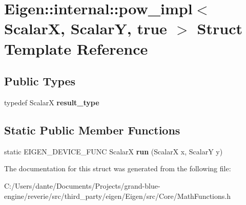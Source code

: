 \hypertarget{struct_eigen_1_1internal_1_1pow__impl_3_01_scalar_x_00_01_scalar_y_00_01true_01_4}{}\section{Eigen\+::internal\+::pow\+\_\+impl$<$ ScalarX, ScalarY, true $>$ Struct Template Reference}
\label{struct_eigen_1_1internal_1_1pow__impl_3_01_scalar_x_00_01_scalar_y_00_01true_01_4}
\subsection*{Public Types}
\begin{DoxyCompactItemize}
\item 
\mbox{\label{struct_eigen_1_1internal_1_1pow__impl_3_01_scalar_x_00_01_scalar_y_00_01true_01_4_a03ee925b6c3569dc25b880c04d22063a}} 
typedef ScalarX {\bfseries result\+\_\+type}
\end{DoxyCompactItemize}
\subsection*{Static Public Member Functions}
\begin{DoxyCompactItemize}
\item 
\mbox{\label{struct_eigen_1_1internal_1_1pow__impl_3_01_scalar_x_00_01_scalar_y_00_01true_01_4_a77a3eb6ae98679ed7ad23b6a965b4221}} 
static E\+I\+G\+E\+N\+\_\+\+D\+E\+V\+I\+C\+E\+\_\+\+F\+U\+NC ScalarX {\bfseries run} (ScalarX x, ScalarY y)
\end{DoxyCompactItemize}


The documentation for this struct was generated from the following file\+:\begin{DoxyCompactItemize}
\item 
C\+:/\+Users/dante/\+Documents/\+Projects/grand-\/blue-\/engine/reverie/src/third\+\_\+party/eigen/\+Eigen/src/\+Core/Math\+Functions.\+h\end{DoxyCompactItemize}
